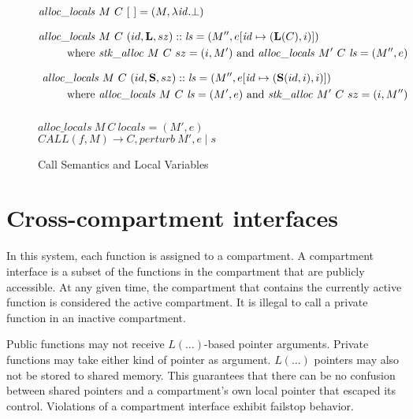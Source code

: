 \documentclass{article}
\begin{document}
\begin{figure}

  \[\begin{split}
  \mathit{alloc\_locals} ~ & M ~ C ~ [~] = (M, \lambda \mathit{id} . \bot) \\[0.75em]
  \mathit{alloc\_locals} ~ & M ~ C ~ (id,\mathbf{L},sz)::\mathit{ls} =
  (M'', e[\mathit{id} \mapsto (\mathbf{L}(C),i)]) \\
  \textnormal{where } & \mathit{stk\_alloc} ~ M ~ C ~ sz = (i, M')
  \textnormal{ and } \mathit{alloc\_locals} ~ M' ~ C ~ \mathit{ls} = (M'', e) \\[0.75em]
  \mathit{alloc\_locals} & ~ M ~ C ~ (id,\mathbf{S},sz)::\mathit{ls} =
  (M'', e[\mathit{id} \mapsto (\mathbf{S}(id,i),i)]) \\
  \textnormal{where } & \mathit{alloc\_locals} ~ M ~ C ~ \mathit{ls} = (M', e)
  \textnormal{ and } \mathit{stk\_alloc} ~ M' ~ C ~ sz = (i, M'') \\[0.75em]
  \end{split}\]

              {\(\mathit{alloc\_locals} ~ M ~ C ~ \mathit{locals} = (M',e)\)}
              {\(\mathit{CALL}(f,M) \longrightarrow
                C,\mathit{perturb} ~ M',e \mid s\)}
  \caption{Call Semantics and Local Variables}
  \label{fig:callret}

\end{figure}

\section{Cross-compartment interfaces}
\label{sec:interfaces}

In this system, each function is assigned to a compartment. A compartment interface
is a subset of the functions in the compartment that are publicly accessible.
At any given time, the compartment that contains the currently active function is
considered the active compartment. It is illegal to call a private function in an
inactive compartment.

Public functions may not receive \(L(\dots)\)-based pointer arguments.
Private functions may take either kind of pointer as argument. \(L(\dots)\) pointers
may also not be stored to shared memory. This guarantees that there can be no
confusion between shared pointers and a compartment's own local pointer that
escaped its control. Violations of a compartment interface exhibit failstop behavior.
\end{document}
